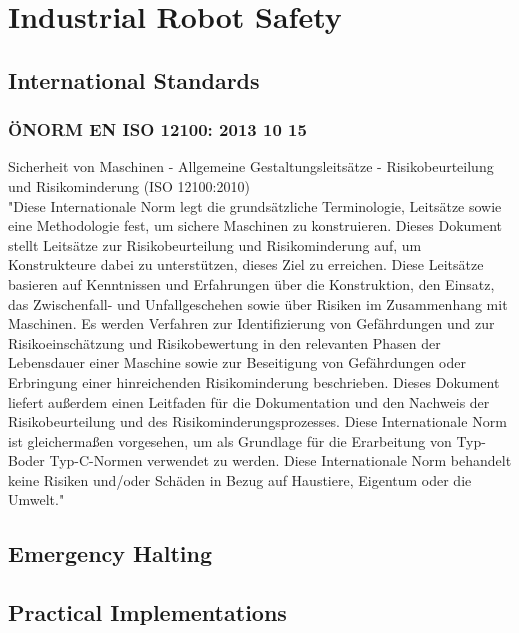 
\section{Industrial Robot Safety}
\subsection{International Standards}
\subsubsection{ÖNORM EN ISO 12100: 2013 10 15}
Sicherheit von Maschinen - Allgemeine Gestaltungsleitsätze - Risikobeurteilung und Risikominderung (ISO 12100:2010)\\
"Diese Internationale Norm legt die grundsätzliche Terminologie, Leitsätze sowie eine Methodologie fest, um sichere Maschinen zu konstruieren. Dieses Dokument stellt Leitsätze zur Risikobeurteilung und Risikominderung auf, um Konstrukteure dabei zu unterstützen, dieses Ziel zu erreichen. Diese Leitsätze basieren auf Kenntnissen und Erfahrungen über die Konstruktion, den Einsatz, das Zwischenfall- und Unfallgeschehen sowie über Risiken im Zusammenhang mit Maschinen. Es werden Verfahren zur Identifizierung von Gefährdungen und zur Risikoeinschätzung und Risikobewertung in den relevanten Phasen der Lebensdauer einer Maschine sowie zur Beseitigung von Gefährdungen oder Erbringung einer hinreichenden Risikominderung beschrieben. Dieses Dokument liefert außerdem einen Leitfaden für die Dokumentation und den Nachweis der Risikobeurteilung und des Risikominderungsprozesses. Diese Internationale Norm ist gleichermaßen vorgesehen, um als Grundlage für die Erarbeitung von Typ-Boder Typ-C-Normen verwendet zu werden. Diese Internationale Norm behandelt keine Risiken und/oder Schäden in Bezug auf Haustiere, Eigentum oder die Umwelt." \cite{ISO-12100-2013-10-15}
\subsection{Emergency Halting}
\subsection{Practical Implementations}
\nocite{*}

